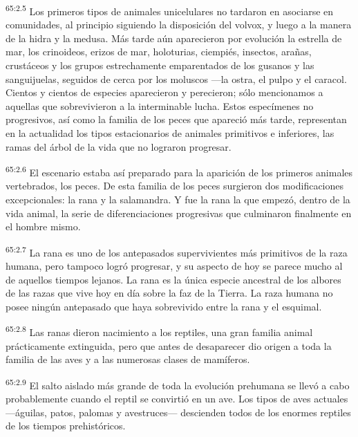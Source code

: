 \par
\textsuperscript{65:2.5} Los primeros tipos de animales unicelulares no tardaron en asociarse en comunidades, al principio siguiendo la disposición del volvox, y luego a la manera de la hidra y la medusa. Más tarde aún aparecieron por evolución la estrella de mar, los crinoideos, erizos de mar, holoturias, ciempiés, insectos, arañas, crustáceos y los grupos estrechamente emparentados de los gusanos y las sanguijuelas, seguidos de cerca por los moluscos ---la ostra, el pulpo y el caracol. Cientos y cientos de especies aparecieron y perecieron; sólo mencionamos a aquellas que sobrevivieron a la interminable lucha. Estos especímenes no progresivos, así como la familia de los peces que apareció más tarde, representan en la actualidad los tipos estacionarios de animales primitivos e inferiores, las ramas del árbol de la vida que no lograron progresar.

\par
\textsuperscript{65:2.6} El escenario estaba así preparado para la aparición de los primeros animales vertebrados, los peces. De esta familia de los peces surgieron dos modificaciones excepcionales: la rana y la salamandra. Y fue la rana la que empezó, dentro de la vida animal, la serie de diferenciaciones progresivas que culminaron finalmente en el hombre mismo.

\par
\textsuperscript{65:2.7} La rana es uno de los antepasados supervivientes más primitivos de la raza humana, pero tampoco logró progresar, y su aspecto de hoy se parece mucho al de aquellos tiempos lejanos. La rana es la única especie ancestral de los albores de las razas que vive hoy en día sobre la faz de la Tierra. La raza humana no posee ningún antepasado que haya sobrevivido entre la rana y el esquimal.

\par
\textsuperscript{65:2.8} Las ranas dieron nacimiento a los reptiles, una gran familia animal prácticamente extinguida, pero que antes de desaparecer dio origen a toda la familia de las aves y a las numerosas clases de mamíferos.

\par
\textsuperscript{65:2.9} El salto aislado más grande de toda la evolución prehumana se llevó a cabo probablemente cuando el reptil se convirtió en un ave. Los tipos de aves actuales ---águilas, patos, palomas y avestruces--- descienden todos de los enormes reptiles de los tiempos prehistóricos.


